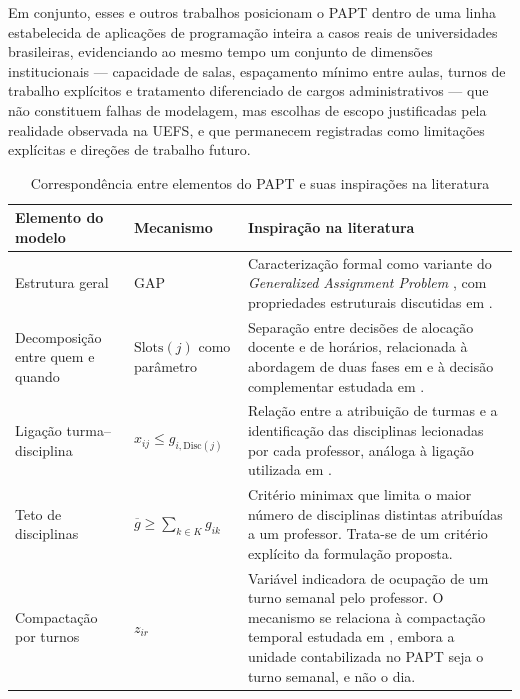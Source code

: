 \documentclass[11pt,a4paper]{article}
\begin{document}
Em conjunto, esses e outros trabalhos posicionam o PAPT dentro de uma linha estabelecida
de aplicações de programação inteira a casos reais de universidades brasileiras,
evidenciando ao mesmo tempo um conjunto de dimensões institucionais --- capacidade de
salas, espaçamento mínimo entre aulas, turnos de trabalho explícitos e tratamento
diferenciado de cargos administrativos --- que não constituem falhas de modelagem, mas
escolhas de escopo justificadas pela realidade observada na UEFS, e que permanecem registradas como limitações explícitas e direções de
trabalho futuro.


\begin{table}[htbp]
\centering
\caption{Correspondência entre elementos do PAPT e suas inspirações na literatura}
\label{tab:correspondencia_literatura}
\small
\begin{tabular}{p{3.4cm}p{3.0cm}p{6.2cm}}
\toprule
\textbf{Elemento do modelo}
& \textbf{Mecanismo}
& \textbf{Inspiração na literatura} \\
\midrule

Estrutura geral
& GAP
& Caracterização formal como variante do
\textit{Generalized Assignment Problem}
\cite{arenales2007pesquisa}, com propriedades estruturais discutidas
em \cite{dantzig1963,martellototh1990}. \\

Decomposição entre quem e quando
& $\mathrm{Slots}(j)$ como parâmetro
& Separação entre decisões de alocação docente e de horários,
relacionada à abordagem de duas fases em
\cite{permanhane2014} e à decisão complementar estudada em
\cite{modesto2025}. \\

Ligação turma--disciplina
& $x_{ij}\leq g_{i,\mathrm{Disc}(j)}$
& Relação entre a atribuição de turmas e a identificação das
disciplinas lecionadas por cada professor, análoga à ligação
utilizada em \cite{permanhane2014}. \\

Teto de disciplinas
& $\overline{g}\geq\sum_{k\in K}g_{ik}$
& Critério minimax que limita o maior número de disciplinas
distintas atribuídas a um professor. Trata-se de um critério
explícito da formulação proposta. \\

Compactação por turnos
& $z_{ir}$
& Variável indicadora de ocupação de um turno semanal pelo
professor. O mecanismo se relaciona à compactação temporal
estudada em \cite{nogueira2018,permanhane2014}, embora a unidade
contabilizada no PAPT seja o turno semanal, e não o dia. \\


\end{tabular}
\end{table}
\end{document}
